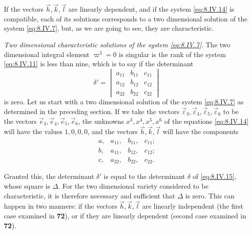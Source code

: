 \documentclass[leqno,11pt]{book}
\numberwithin{equation}{chapter}
\theoremstyle{shape1}
\theoremstyle{shape0}
\theoremstyle{shape2}
\theoremstyle{definition}
\begin{document}
If the vectors $\vec h,\vec k,\vec l$ are linearly dependent, and if the system \eqref{eq:8.IV.14} is compatible, each of its solutions corresponds to a two dimensional solution of the system \eqref{eq:8.IV.7}, but, as we are going to see, they are characteristic.


\vspace{12pt}\fsec \emph{Two dimensional characteristic solutions of the system \eqref{eq:8.IV.7}}. The two dimensional integral element $\varpi^{3}=0$ is singular is the rank of the system  \eqref{eq:8.IV.11} is less than nine, which is to say if the determinant
\[
\delta'=
\begin{vmatrix}
  a_{11}&b_{11}&c_{11}\\
  a_{12}&b_{12}&c_{12}\\
  a_{22}&b_{22}&c_{22}
\end{vmatrix}
\]
is zero. Let us start with a two dimensional solution of the system \eqref{eq:8.IV.7} as determined in the preceding section. If we take the vectors $\vec\varepsilon_{3},\vec\varepsilon_{4},\vec\varepsilon_{5},\vec\varepsilon_{6}$ to be the vectors $\vec e_{3},\vec e_{4},\vec e_{5},\vec e_{6}$, the unknowns $x^{3},x^{4},x^{5},x^{6}$ of the equations \eqref{eq:8.IV.14} will have the values $1,0,0,0$, and the vectors $\vec h, \vec k, \vec l$ will have the components
\[
\begin{matrix}
  a,&a_{11},&b_{11},&c_{11};\\
  b,&a_{11},&b_{12},&c_{12};\\
  c,&a_{22},&b_{22},&c_{22}.
\end{matrix}
\]

Granted this, the determinant $\delta'$ is equal to the determinant $\delta$ of \eqref{eq:8.IV.15}, whose square is $\Delta$. For the two dimensional variety considered to be characteristic, it is therefore necessary and sufficient that $\Delta$ is zero. This can happen in two manners: if the vectors $\vec h,\vec k,\vec l$ are linearly independent (the first case examined in \textsection\textbf{72}), or if they are linearly dependent (second case examined in \textsection\textbf{72}).
\end{document}
